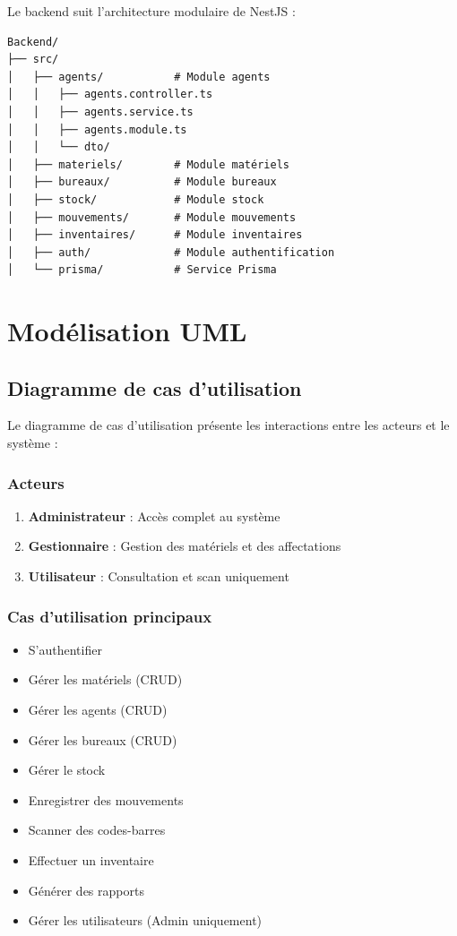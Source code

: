 \documentclass[12pt,a4paper]{report}
\begin{document}
Le backend suit l'architecture modulaire de NestJS :

\begin{verbatim}
Backend/
├── src/
│   ├── agents/           # Module agents
│   │   ├── agents.controller.ts
│   │   ├── agents.service.ts
│   │   ├── agents.module.ts
│   │   └── dto/
│   ├── materiels/        # Module matériels
│   ├── bureaux/          # Module bureaux
│   ├── stock/            # Module stock
│   ├── mouvements/       # Module mouvements
│   ├── inventaires/      # Module inventaires
│   ├── auth/             # Module authentification
│   └── prisma/           # Service Prisma
\end{verbatim}

\section{Modélisation UML}

\subsection{Diagramme de cas d'utilisation}

Le diagramme de cas d'utilisation présente les interactions entre les acteurs et le système :

\subsubsection{Acteurs}

\begin{enumerate}
    \item \textbf{Administrateur} : Accès complet au système
    \item \textbf{Gestionnaire} : Gestion des matériels et des affectations
    \item \textbf{Utilisateur} : Consultation et scan uniquement
\end{enumerate}

\subsubsection{Cas d'utilisation principaux}

\begin{itemize}
    \item S'authentifier
    \item Gérer les matériels (CRUD)
    \item Gérer les agents (CRUD)
    \item Gérer les bureaux (CRUD)
    \item Gérer le stock
    \item Enregistrer des mouvements
    \item Scanner des codes-barres
    \item Effectuer un inventaire
    \item Générer des rapports
    \item Gérer les utilisateurs (Admin uniquement)
\end{itemize}
\end{document}
